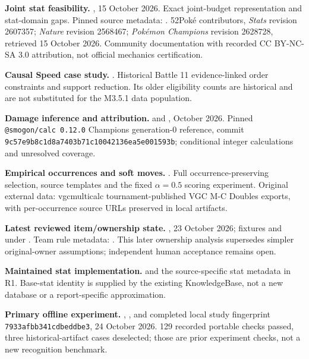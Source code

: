 \documentclass[10pt,a4paper]{article}
\begin{document}
\begin{enumerate}[label={[R\arabic*]}]
\item \textbf{Joint stat feasibility.} , 15 October 2026. Exact joint-budget representation and stat-domain gaps. Pinned source metadata: . 52Pok\'e contributors, \emph{Stats} revision 2607357; \emph{Nature} revision 2568467; \emph{Pok\'emon Champions} revision 2628728, retrieved 15 October 2026. Community documentation with recorded CC BY-NC-SA 3.0 attribution, not official mechanics certification.
\item \textbf{Causal Speed case study.} . Historical Battle 11 evidence-linked order constraints and support reduction. Its older eligibility counts are historical and are not substituted for the M3.5.1 data population.
\item \textbf{Damage inference and attribution.}  and , October 2026. Pinned \texttt{@smogon/calc 0.12.0} Champions generation-0 reference, commit \texttt{9c57e9b8c1d8a7403b71c10042136ea5e001593b}; conditional integer calculations and unresolved coverage.
\item \textbf{Empirical occurrences and soft moves.} . Full occurrence-preserving selection, source templates and the fixed $\alpha=0.5$ scoring experiment. Original external data: vgcmulticalc tournament-published VGC M-C Doubles exports, with per-occurrence source URLs preserved in local artifacts.
\item \textbf{Latest reviewed item/ownership state.} , 23 October 2026; fixtures  and  under . Team rule metadata: . This later ownership analysis supersedes simpler original-owner assumptions; independent human acceptance remains open.
\item \textbf{Maintained stat implementation.}  and the source-specific stat metadata in R1. Base-stat identity is supplied by the existing KnowledgeBase, not a new database or a report-specific approximation.
\item \textbf{Primary offline experiment.} , , and completed local study fingerprint \texttt{7933afbb341cdbeddbe3}, 24 October 2026. 129 recorded portable checks passed, three historical-artifact cases deselected; those are prior experiment checks, not a new recognition benchmark.
\end{enumerate}
\end{document}

